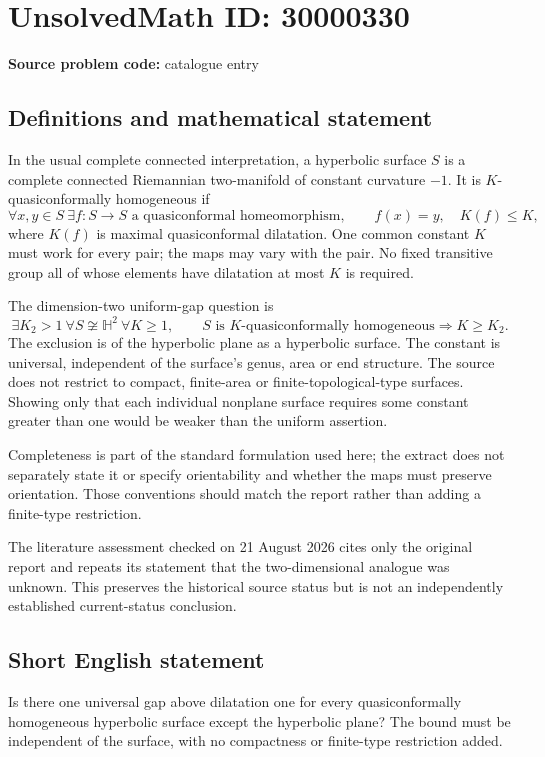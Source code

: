 \documentclass[11pt]{article}
\begin{document}
\section*{UnsolvedMath ID: 30000330}
\textbf{Source problem code:} catalogue entry
\subsection{Definitions and mathematical statement}
In the usual complete connected interpretation, a hyperbolic surface $S$ is a complete connected Riemannian two-manifold of constant curvature $-1$. It is $K$-quasiconformally homogeneous if
\[
 \forall x,y\in S\ \exists f:S\to S\text{ a quasiconformal homeomorphism},
 \qquad f(x)=y,\quad K(f)\le K,
\]
where $K(f)$ is maximal quasiconformal dilatation. One common constant $K$ must work for every pair; the maps may vary with the pair. No fixed transitive group all of whose elements have dilatation at most $K$ is required.

The dimension-two uniform-gap question is
\[
 \exists K_2>1\ \forall S\not\cong\mathbb H^2\ \forall K\ge1,
 \qquad S\text{ is }K\text{-quasiconformally homogeneous}
 \Longrightarrow K\ge K_2.
\]
The exclusion is of the hyperbolic plane as a hyperbolic surface. The constant is universal, independent of the surface's genus, area or end structure. The source does not restrict to compact, finite-area or finite-topological-type surfaces. Showing only that each individual nonplane surface requires some constant greater than one would be weaker than the uniform assertion.

Completeness is part of the standard formulation used here; the extract does not separately state it or specify orientability and whether the maps must preserve orientation. Those conventions should match the report rather than adding a finite-type restriction.

The literature assessment checked on 21 August 2026 cites only the original report and repeats its statement that the two-dimensional analogue was unknown. This preserves the historical source status but is not an independently established current-status conclusion.
\subsection{Short English statement}
Is there one universal gap above dilatation one for every quasiconformally homogeneous hyperbolic surface except the hyperbolic plane? The bound must be independent of the surface, with no compactness or finite-type restriction added.
\end{document}
